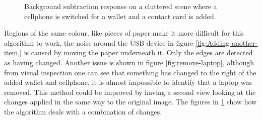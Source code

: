 \documentclass[english]{IEEEtran}
\theoremstyle{plain}
\begin{document}
\begin{figure}

\caption{\label{fig:back-Proces-clutter}Background subtraction response on
a cluttered scene where a cellphone is switched for a wallet and a
contact card is added.}

\end{figure}


Regions of the same colour, like pieces of paper make it more difficult
for this algorithm to work, the noise around the USB device in figure
\ref{fig:Adding-another-item,} is caused by moving the paper underneath
it. Only the edges are detected as having changed. Another issue is
shown in figure \ref{fig:remove-laptop}, although from visual inspection
one can see that something has changed to the right of the added wallet
and cellphone, it is almost impossible to identify that a laptop was
removed. This method could be improved by having a second view looking
at the changes applied in the same way to the original image. The
figures in \ref{fig:back-Proces-clutter} show how the algorithm deals
with a combination of changes. 
\end{document}
